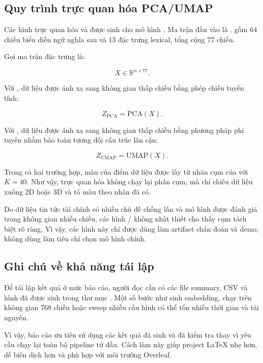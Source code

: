 \subsection{Quy trình trực quan hóa PCA/UMAP}

Các hình trực quan hóa  và  được sinh cho mô hình . Ma trận đầu vào là , gồm 64 chiều biểu diễn ngữ nghĩa sau  và 13 đặc trưng lexical, tổng cộng 77 chiều.

Gọi ma trận đặc trưng là:

\begin{equation*}
X \in \mathbb{R}^{n \times 77}.
\end{equation*}

Với , dữ liệu được ánh xạ sang không gian thấp chiều bằng phép chiếu tuyến tính:

\begin{equation*}
Z_{\mathrm{PCA}} = \mathrm{PCA}(X).
\end{equation*}

Với , dữ liệu được ánh xạ sang không gian thấp chiều bằng phương pháp phi tuyến nhằm bảo toàn tương đối cấu trúc lân cận:

\begin{equation*}
Z_{\mathrm{UMAP}} = \mathrm{UMAP}(X).
\end{equation*}

Trong cả hai trường hợp, màu của điểm dữ liệu được lấy từ nhãn cụm của  với \(K=40\). Như vậy, trực quan hóa không chạy lại phân cụm, mà chỉ chiếu dữ liệu xuống 2D hoặc 3D và tô màu theo nhãn đã có.

Do dữ liệu tin tức tài chính có nhiều chủ đề chồng lấn và mô hình được đánh giá trong không gian nhiều chiều, các hình / không nhất thiết cho thấy cụm tách biệt rõ ràng. Vì vậy, các hình này chỉ được dùng làm artifact chẩn đoán và demo, không dùng làm tiêu chí chọn mô hình chính.

\subsection{Ghi chú về khả năng tái lập}

Để tái lập kết quả ở mức báo cáo, người đọc cần có các file summary, CSV và hình đã được sinh trong thư mục . Một số bước như sinh embedding, chạy  trên không gian 768 chiều hoặc sweep nhiều cấu hình có thể tốn nhiều thời gian và tài nguyên.

Vì vậy, báo cáo ưu tiên sử dụng các kết quả đã sinh và đã kiểm tra thay vì yêu cầu chạy lại toàn bộ pipeline từ đầu. Cách làm này giúp project LaTeX nhẹ hơn, dễ biên dịch hơn và phù hợp với môi trường Overleaf.
